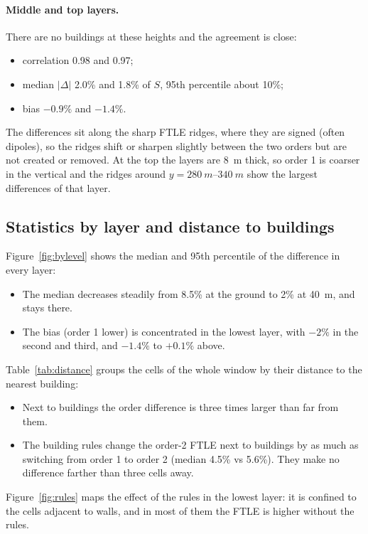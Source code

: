 \documentclass[11pt,a4paper]{article}
\begin{document}
\paragraph{Middle and top layers.} There are no buildings at these heights and
the agreement is close:
\begin{itemize}
  \item correlation 0.98 and 0.97;
  \item median $|\Delta|$ 2.0\% and 1.8\% of $S$, 95th percentile about 10\%;
  \item bias $-0.9\%$ and $-1.4\%$.
\end{itemize}
The differences sit along the sharp FTLE ridges, where they are signed
(often dipoles), so the ridges shift or sharpen slightly between the two orders but
are not created or removed. At the top the layers are \SI{8}{m} thick, so order 1
is coarser in the vertical and the ridges around $y=\SIrange{280}{340}{m}$ show
the largest differences of that layer.

\subsection{Statistics by layer and distance to buildings}

Figure~\ref{fig:bylevel} shows the median and 95th percentile of the
difference in every layer:
\begin{itemize}
  \item The median decreases steadily from 8.5\% at the ground to 2\%
        at \SI{40}{m}, and stays there.
  \item The bias (order 1 lower) is concentrated in the lowest layer, with
        $-2\%$ in the second and third, and $-1.4\%$ to $+0.1\%$ above.
\end{itemize}
Table~\ref{tab:distance} groups the cells of the whole window by their
distance to the nearest building:
\begin{itemize}
  \item Next to buildings the order difference is three times larger than
        far from them.
  \item The building rules change the order-2 FTLE next to buildings by as
        much as switching from order 1 to order 2 (median 4.5\% vs 5.6\%).
        They make no difference farther than three cells away.
\end{itemize}
Figure~\ref{fig:rules} maps the effect of the rules in the lowest layer: it is
confined to the cells adjacent to walls, and in most of them the FTLE is
higher without the rules.
\end{document}
